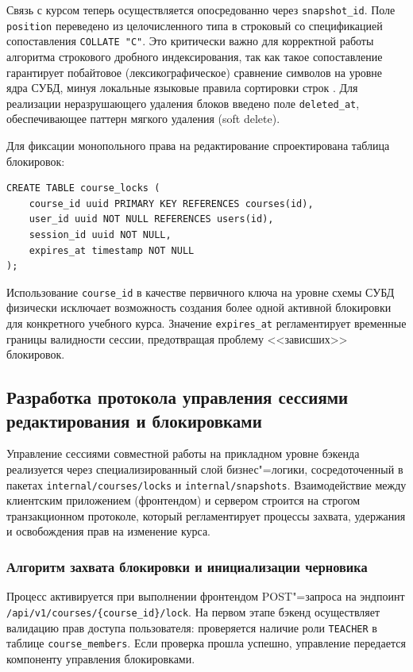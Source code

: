 \documentclass[coursework]{SCWorks}
\begin{document}
Связь с курсом теперь осуществляется опосредованно через \texttt{snapshot\_id}. Поле \texttt{position} переведено из целочисленного типа в строковый со спецификацией сопоставления \texttt{COLLATE "C"}. Это критически важно для корректной работы алгоритма строкового дробного индексирования, так как такое сопоставление гарантирует побайтовое (лексикографическое) сравнение символов на уровне ядра СУБД, минуя локальные языковые правила сортировки строк \cite{postgres_collation}. Для реализации неразрушающего удаления блоков введено поле \texttt{deleted\_at}, обеспечивающее паттерн мягкого удаления (soft delete).

Для фиксации монопольного права на редактирование спроектирована таблица блокировок:

\begin{verbatim}
CREATE TABLE course_locks (
    course_id uuid PRIMARY KEY REFERENCES courses(id),
    user_id uuid NOT NULL REFERENCES users(id),
    session_id uuid NOT NULL,
    expires_at timestamp NOT NULL
);
\end{verbatim}

Использование \texttt{course\_id} в качестве первичного ключа на уровне схемы СУБД физически исключает возможность создания более одной активной блокировки для конкретного учебного курса. Значение \texttt{expires\_at} регламентирует временные границы валидности сессии, предотвращая проблему <<зависших>> блокировок.

\subsection{Разработка протокола управления сессиями редактирования и блокировками}

Управление сессиями совместной работы на прикладном уровне бэкенда реализуется через специализированный слой бизнес"=логики, сосредоточенный в пакетах \texttt{internal/courses/locks} и \texttt{internal/snapshots}. Взаимодействие между клиентским приложением (фронтендом) и сервером строится на строгом транзакционном протоколе, который регламентирует процессы захвата, удержания и освобождения прав на изменение курса.

\subsubsection{Алгоритм захвата блокировки и инициализации черновика}

Процесс активируется при выполнении фронтендом POST"=запроса на эндпоинт \texttt{/api/v1/courses/\{course\_id\}/lock}. На первом этапе бэкенд осуществляет валидацию прав доступа пользователя: проверяется наличие роли \texttt{TEACHER} в таблице \texttt{course\_members}. Если проверка прошла успешно, управление передается компоненту управления блокировками.
\end{document}
